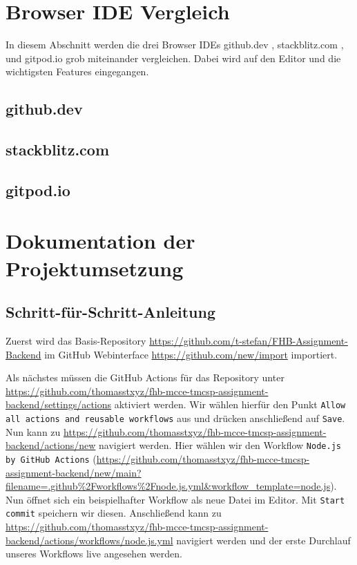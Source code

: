 \section{Browser IDE Vergleich}
In diesem Abschnitt werden die drei Browser IDEs
github.dev \cite{githubDevWebsite},
stackblitz.com \cite{stackblitzcomWebsite},
und
gitpod.io \cite{gitpodioWebsite}
grob miteinander vergleichen.
Dabei wird auf den Editor und die wichtigsten Features eingegangen.

\subsection{github.dev}

\subsection{stackblitz.com}

\subsection{gitpod.io}


\clearpage
\section{Dokumentation der Projektumsetzung}

\subsection{Schritt-für-Schritt-Anleitung}
Zuerst wird das Basis-Repository 
\url{https://github.com/t-stefan/FHB-Assignment-Backend}
im GitHub Webinterface
\url{https://github.com/new/import} 
importiert.


\noindent
Als nächstes müssen die GitHub Actions für das Repository unter
\url{https://github.com/thomasstxyz/fhb-mcce-tmcsp-assignment-backend/settings/actions}
aktiviert werden.
Wir wählen hierfür den Punkt \verb|Allow all actions and reusable workflows| aus
und drücken anschließend auf \verb|Save|. \\

\noindent
Nun kann zu \url{https://github.com/thomasstxyz/fhb-mcce-tmcsp-assignment-backend/actions/new}
navigiert werden.
Hier wählen wir den Workflow \verb|Node.js by GitHub Actions| 
(\url{https://github.com/thomasstxyz/fhb-mcce-tmcsp-assignment-backend/new/main?filename=.github%2Fworkflows%2Fnode.js.yml&workflow_template=node.js}).
Nun öffnet sich ein beispielhafter Workflow als neue Datei im Editor.
Mit \verb|Start commit| speichern wir diesen.
Anschließend kann zu \url{https://github.com/thomasstxyz/fhb-mcce-tmcsp-assignment-backend/actions/workflows/node.js.yml}
navigiert werden und der erste Durchlauf unseres Workflows live angesehen werden.



